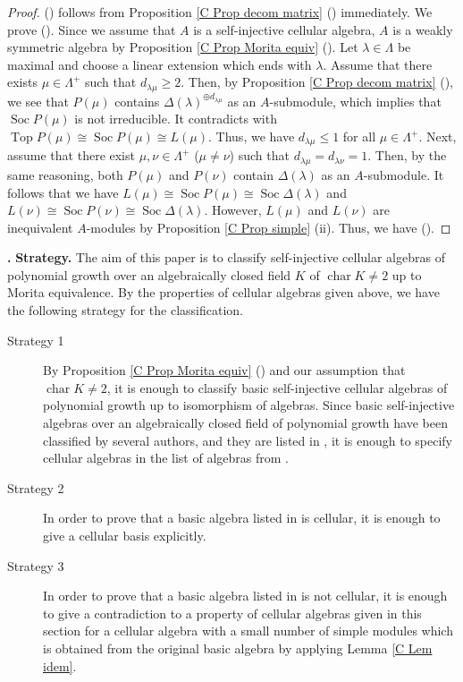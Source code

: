 \documentclass[12pt]{amsart}
\def \para{\refstepcounter{thm} \par\medskip\noindent
                \textbf{\thethm .} }
\numberwithin{equation}{thm}
\newcommand\la{\lambda}
\newcommand\D{\Delta}
\newcommand\vL{\varLambda}
\newcommand\Top{\operatorname{Top}}
\newcommand\Soc{\operatorname{Soc}}
\newcommand\cha{\operatorname{char}}
\newcounter{ichi}
\newcommand{\roi}{\roman{ichi}}
\newcounter{ni}
\newcommand{\roii}{\roman{ni}}
\begin{document}
\begin{proof} 
(\roi) follows from Proposition \ref{C Prop decom matrix} (\roi) immediately. 
We prove (\roii). 
Since we assume that $A$ is a self-injective cellular algebra, 
$A$ is a weakly symmetric algebra by Proposition \ref{C Prop Morita equiv} (\roii). 
%
Let $\la \in \vL$ be maximal and choose a linear extension which ends with $\la$. 
Assume that there exists $\mu \in \vL^+$ such that $d_{\la \mu} \geq 2$. 
Then, by Proposition \ref{C Prop decom matrix} (\roii), 
we see that $P(\mu)$ contains $\D(\la)^{\oplus d_{\la \mu}}$ as an $A$-submodule, 
which implies that $\Soc P(\mu)$ is not irreducible. It contradicts with 
$\Top P(\mu) \cong \Soc P(\mu) \cong L(\mu)$. 
Thus, we have $d_{\la \mu} \leq 1$ for all $\mu \in \vL^+$. 
Next, assume that there exist $\mu, \nu \in \vL^+$ ($\mu \not=\nu$) 
such that $d_{\la \mu}= d_{\la \nu}=1$. 
Then, by the same reasoning, both $P(\mu)$ and $P(\nu)$ contain $\D(\la)$ as an $A$-submodule. It follows that 
we have 
$L(\mu) \cong \Soc P(\mu) \cong \Soc \D(\la)$ 
and 
$L(\nu) \cong \Soc P(\nu) \cong \Soc \D(\la)$. 
However, $L(\mu)$ and $L(\nu)$ are inequivalent $A$-modules by Proposition \ref{C Prop simple} (ii).
Thus, we have (\roii). 
\end{proof}


\para {\bf Strategy.} 
The aim of this paper is to classify self-injective cellular algebras of polynomial growth 
over an algebraically closed field $K$ of $\cha K \not=2$ up to Morita equivalence. 
By the properties of cellular algebras given above, 
we have the following strategy for the classification. 

\begin{description} 
\item[Strategy 1]
By Proposition \ref{C Prop Morita equiv} (\roi) and our assumption that $\cha K \not=2$, 
it is enough to classify basic self-injective cellular algebras of polynomial growth 
up to isomorphism of algebras.  
Since basic self-injective algebras over an algebraically closed field of polynomial growth 
have been classified by several authors, 
and they are listed in \cite{S}, 
it is enough to specify cellular algebras in the list of algebras from \cite{S}.

\item[Strategy 2] 
In order to prove that a basic algebra listed in \cite{S} is cellular,
it is enough to give a cellular basis explicitly. 

\item[Strategy 3] 
In order to prove that a basic algebra listed in \cite{S} is not cellular, 
it is enough to give a contradiction to a property of cellular algebras given in this section 
for a cellular algebra with a small number of simple modules which is obtained from the original basic algebra 
by applying Lemma \ref{C Lem idem}.

\end{description}
\end{document}
